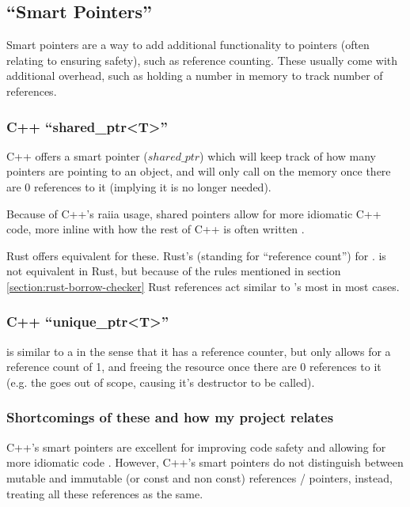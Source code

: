 \documentclass[a4paper]{article}
\begin{document}
\subsection{``Smart Pointers''}
Smart pointers are a way to add additional functionality to pointers (often relating to ensuring safety), such as reference counting. These usually come with additional overhead, such as holding a number in memory to track number of references.

\subsubsection{C++ ``shared\_ptr\textless T\textgreater''}
C++ offers a smart pointer ($shared\_ptr$) which will keep track of how many pointers are pointing to an object, and will only call  on the memory once there are 0 references to it (implying it is no longer needed).

Because of C++'s \gls{raiia} usage, shared pointers allow for more idiomatic C++ code, more inline with how the rest of C++ is often written \parencite{cppreference-raii}.

Rust offers equivalent for these. Rust's  (standing for ``reference count'') for .  is not equivalent in Rust, but because of the rules mentioned in section \ref{section:rust-borrow-checker} Rust references act similar to 's most in most cases.
\subsubsection{C++ ``unique\_ptr\textless T\textgreater''}
 is similar to a  in the sense that it has a reference counter, but  only allows for a reference count of 1, and freeing the resource once there are 0 references to it (e.g. the  goes out of scope, causing it's destructor to be called).
\subsubsection{Shortcomings of these and how my project relates}
C++'s smart pointers are excellent for improving code safety and allowing for more idiomatic code \parencite{msdocs-smartpointers}. However, C++'s smart pointers do not distinguish between mutable and immutable (or const and non const) references / pointers, instead, treating all these references as the same.
\end{document}
